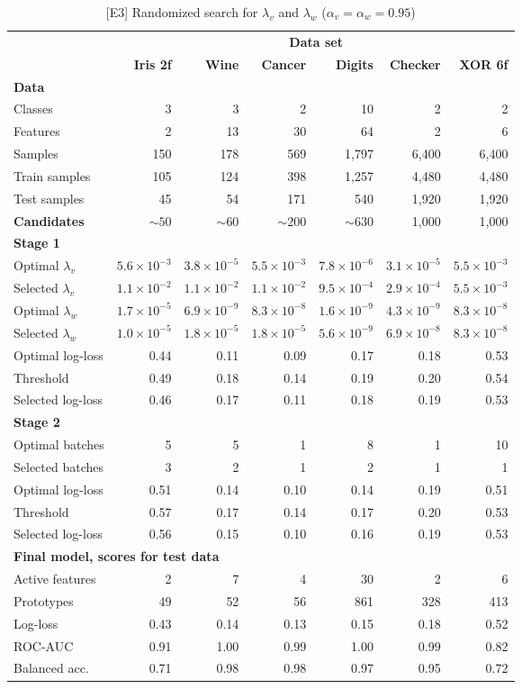 %
\begin{table}
\caption{[E3] Randomized search for $\lambda_v$ and $\lambda_w$ ($\alpha_v=\alpha_w=0.95$)}
\label{tab_e3}
%
\begin{center}
\small
\begin{tabular}{|lrrrrrr|}
\hline
&\multicolumn{6}{c|}{\textbf{\hrulefill\ Data set \hrulefill}}\\
&\textbf{Iris 2f}&\textbf{Wine}&\textbf{Cancer}&\textbf{Digits}&\textbf{Checker}&\textbf{XOR 6f}\\
\multicolumn{7}{|l|}{\textbf{Data}}\\
Classes&3&3&2&10&2&2\\
Features&2&13&30&64&2&6\\
Samples&150&178&569&1,797&6,400&6,400\\
Train samples&105&124&398&1,257&4,480&4,480\\
Test samples&45&54&171&540&1,920&1,920\\
\textbf{Candidates}&$\sim50$&$\sim60$&$\sim200$&$\sim630$&1,000&1,000\\
\multicolumn{7}{|l|}{\textbf{Stage 1}}\\
Optimal $\lambda_v$&$5.6\times10^{-3}$&$3.8\times10^{-5}$&$5.5\times10^{-3}$&$7.8\times10^{-6}$&$3.1\times10^{-5}$&$5.5\times10^{-3}$\\
Selected $\lambda_v$&$1.1\times10^{-2}$&$1.1\times10^{-2}$&$1.1\times10^{-2}$&$9.5\times10^{-4}$&$2.9\times10^{-4}$&$5.5\times10^{-3}$\\
Optimal $\lambda_w$&$1.7\times10^{-5}$&$6.9\times10^{-9}$&$8.3\times10^{-8}$&$1.6\times10^{-9}$&$4.3\times10^{-9}$&$8.3\times10^{-8}$\\
Selected $\lambda_w$&$1.0\times10^{-5}$&$1.8\times10^{-5}$&$1.8\times10^{-5}$&$5.6\times10^{-9}$&$6.9\times10^{-8}$&$8.3\times10^{-8}$\\
Optimal log-loss&0.44&0.11&0.09&0.17&0.18&0.53\\
Threshold&0.49&0.18&0.14&0.19&0.20&0.54\\
Selected log-loss&0.46&0.17&0.11&0.18&0.19&0.53\\
\multicolumn{7}{|l|}{\textbf{Stage 2}}\\
Optimal batches&5&5&1&8&1&10\\
Selected batches&3&2&1&2&1&1\\
Optimal log-loss&0.51&0.14&0.10&0.14&0.19&0.51\\
Threshold&0.57&0.17&0.14&0.17&0.20&0.53\\
Selected log-loss&0.56&0.15&0.10&0.16&0.19&0.53\\
\multicolumn{7}{|l|}{\textbf{Final model, scores for test data}}\\
Active features&2&7&4&30&2&6\\
Prototypes&49&52&56&861&328&413\\
Log-loss&0.43&0.14&0.13&0.15&0.18&0.52\\
ROC-AUC&0.91&1.00&0.99&1.00&0.99&0.82\\
Balanced acc.&0.71&0.98&0.98&0.97&0.95&0.72\\
\hline
\end{tabular}
\end{center}
\end{table}
